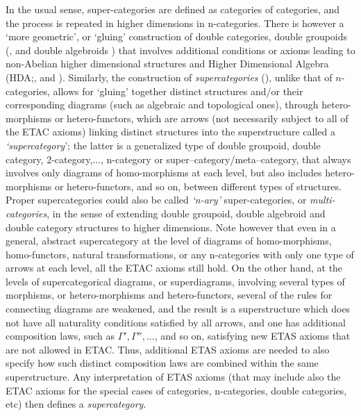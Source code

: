 \documentclass[12pt]{article}
\theoremstyle{plain}
\theoremstyle{definition}
\numberwithin{equation}{section}
\begin{document}
In the usual sense, super-categories are defined as categories of categories,
and the process is repeated in higher dimensions in n-categories. There is however
a `more geometric', or `gluing' construction of double categories, double groupoids (\cite{BS}, and 
double algebroids \cite{BM}) that involves additional conditions or axioms leading to non-Abelian higher dimensional structures and Higher Dimensional Algebra (HDA;\cite{BS},\cite{BM} and \cite{BGB2}). Similarly, the construction of \textit{supercategories} (\cite{ICB3}), unlike that of $n$-categories, allows for `gluing' together distinct structures
and/or their corresponding diagrams (such as algebraic and topological ones), through hetero-morphisms or hetero-functors, which are arrows (not necessarily subject to all of the ETAC axioms) linking distinct structures into the superstructure called a \textit{`supercategory}'; the latter is a generalized type of double groupoid, double category, 2-category,..., n-category or super--category/meta--category, that always involves only diagrams of homo-morphisms at each level, but also includes hetero-morphisms or hetero-functors, and so on, between different types of structures. 
Proper supercategories could also be called \textit{`n-ary'} super-categories, or \textit{multi-categories}, in the sense of extending double groupoid, double algebroid and double category structures to higher dimensions. 
Note however that even in a general, abstract supercategory at the level of diagrams of homo-morphisms, homo-functors, natural transformations, or any n-categories with only one type of arrows at each level, all the ETAC axioms still hold. On the other hand, at the levels of supercategorical diagrams, or superdiagrams, involving several types of morphisms, or hetero-morphisms and hetero-functors, several of the rules for connecting diagrams are weakened, and the result is a superstructure which does not have all naturality conditions satisfied by all arrows, and one has additional composition laws, such as $\Gamma', \Gamma'', ...$, and so on,  satisfying new ETAS axioms that are not allowed in ETAC. Thus, additional ETAS axioms are needed to also specify how such distinct composition laws are combined within the same superstructure. Any interpretation of ETAS axioms (that may include also the ETAC axioms for the special cases of categories, n-categories, double categories, etc) then defines a \textit{supercategory}.
\end{document}
